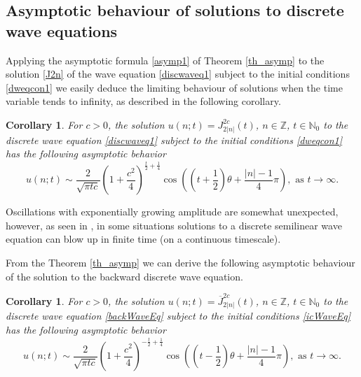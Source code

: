\documentclass[12pt]{amsart}
\numberwithin{equation}{section}
\newtheorem{corollary}[theorem]{Corollary}
\newtheorem{remark}[theorem]{Remark}
\begin{document}

\subsection{Asymptotic behaviour of solutions to discrete wave equations}

Applying the asymptotic formula \eqref{asymp1} of Theorem \ref{th_asymp} to the solution  \eqref{J2n} of the wave equation \eqref{discwaveq1} subject to the initial conditions \eqref{dweqcon1} we easily deduce the limiting behaviour of solutions  when the time
variable tends to infinity, as described in the following corollary.

\begin{corollary}\label{cor forward asympt}
For $c>0$, the solution $u(n;t)=J_{2|n|}^{2c}(t)$, $n\in\mathbb{Z}$, $t\in\mathbb{N}_0$ to the discrete wave equation \eqref{discwaveq1} subject to the initial conditions \eqref{dweqcon1} has the following asymptotic behavior
\begin{equation*}
u\left( n;t\right) \sim \frac{2}{\sqrt{\pi tc}}\left( 1+\frac{c^{2}}{4}%
\right) ^{\frac{t}{2}+\frac{1}{4}}\cos \left( \left( t+\frac{1}{2}\right)
\theta +\frac{\left\vert n\right\vert -1}{4}\pi \right), \text{ \ as }%
t\rightarrow \infty \text{.}
\end{equation*}
\end{corollary}

Oscillations with exponentially growing amplitude are somewhat unexpected, however, as seen in \cite{Ch22}, in some situations solutions to a discrete semilinear wave equation can blow up in finite time (on a continuous timescale).

From the Theorem \ref{th_asymp} we can derive the following asymptotic
behaviour of the solution to the backward discrete wave equation.

\begin{corollary}\label{cor backward asympt}
For $c>0$,  the solution $u\left( n;t\right) =\overline{J}_{2\left\vert n\right\vert }^{2c}\left(
t\right)$, $n\in\mathbb{Z}$, $t\in\mathbb{N}_0$ to the discrete wave
equation \eqref{backWaveEq} subject to the initial conditions %
\eqref{icWaveEq} has the following asymptotic behavior
\begin{equation*}
u\left( n;t\right) \sim \frac{2}{\sqrt{\pi tc}}\left( 1+\frac{c^{2}}{4}%
\right) ^{-\frac{t}{2}+\frac{1}{4}}\cos \left( \left( t-\frac{1}{2}\right)
\theta +\frac{\left\vert n\right\vert -1}{4}\pi \right), \text{ \ as }%
t\rightarrow \infty \text{.}
\end{equation*}
\end{corollary}
\end{document}
